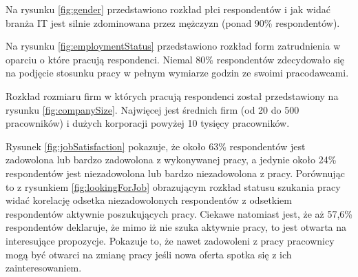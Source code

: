 
Na rysunku \ref{fig:gender} przedstawiono rozkład płci respondentów i jak widać branża IT jest silnie zdominowana przez mężczyzn (ponad 90\% respondentów).



Na rysunku \ref{fig:employmentStatus} przedstawiono rozkład form zatrudnienia w oparciu o które pracują respondenci.
Niemal 80\% respondentów zdecydowało się na podjęcie stosunku pracy w pełnym wymiarze godzin ze swoimi pracodawcami.



Rozkład rozmiaru firm w których pracują respondenci został przedstawiony na rysunku \ref{fig:companySize}. Najwięcej jest średnich firm (od 20 do 500 pracowników) i dużych korporacji powyżej 10 tysięcy pracowników.



Rysunek \ref{fig:jobSatisfaction} pokazuje, że około 63\% respondentów jest zadowolona lub bardzo zadowolona z wykonywanej pracy, a jedynie około 24\% respondentów jest niezadowolona lub bardzo niezadowolona z pracy.
Porównując to z rysunkiem \ref{fig:lookingForJob} obrazującym rozkład statusu szukania pracy widać korelację odsetka niezadowolonych respondentów z odsetkiem respondentów aktywnie poszukujących pracy.
Ciekawe natomiast jest, że aż 57,6\% respondentów deklaruje, że mimo iż nie szuka aktywnie pracy, to jest otwarta na interesujące propozycje.
Pokazuje to, że nawet zadowoleni z pracy pracownicy mogą być otwarci na zmianę pracy jeśli nowa oferta spotka się z ich zainteresowaniem.


